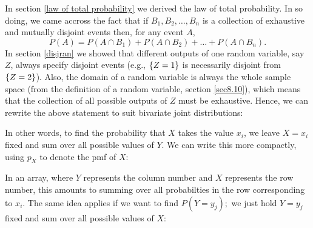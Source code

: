 \noindent In section \ref{law of total probability} we derived the law of total probability. In so doing, we came accross the fact that if $B_1,B_2,\ldots,B_n$ is a collection of exhaustive and mutually disjoint events then, for any event $A$,
\[
P(A) = P(A \cap B_1) + P(A \cap B_2) + \ldots + P(A \cap B_n).
\]
In section \ref{disjran} we showed that different outputs of one random variable, say $Z$, always specify disjoint events (e.g., $\left\{Z = 1\right\}$ is necessarily disjoint from $\left\{Z = 2\right\}$). Also, the domain of a random variable is always the whole sample space (from the definition of a random variable, section \ref{sec8.10}), which means that the collection of all possible outputs of $Z$ must be exhaustive. Hence, we can rewrite the above statement to suit bivariate joint distributions:

  	\bigskip
	
	\hfil{}
	\bigskip

\noindent In other words, to find the probability that $X$ takes the value $x_i$, we leave $X = x_i$ fixed and sum over all possible values of $Y$. We can write this more compactly, using $p_X$ to denote the pmf of $X$:

  	\bigskip
	
	\hfil{}
	\bigskip

\noindent In an array, where $Y$ represents the column number and $X$ represents the row number, this amounts to summing over all probabilties in the row corresponding to $x_i$. The same idea applies if we want to find $P(Y = y_j);$ we just hold $Y = y_j$ fixed and sum over all possible values of $X$:

  	\bigskip
	
	\hfil{}
	\bigskip

